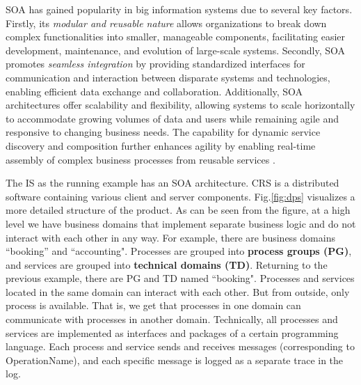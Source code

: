 \documentclass[12pt, times]{article}
\begin{document}
	\hspace*{5mm}SOA has gained popularity in big information systems due to several key factors. Firstly, its \textit{modular and reusable nature} allows organizations to break down complex functionalities into smaller, manageable components, facilitating easier development, maintenance, and evolution of large-scale systems. Secondly, SOA promotes \textit{seamless integration} by providing standardized interfaces for communication and interaction between disparate systems and technologies, enabling efficient data exchange and collaboration. Additionally, SOA architectures offer scalability and flexibility, allowing systems to scale horizontally to accommodate growing volumes of data and users while remaining agile and responsive to changing business needs. The capability for dynamic service discovery and composition further enhances agility by enabling real-time assembly of complex business processes from reusable services \cite{soa_2}. 
	
	\hspace*{5mm}The IS as the running example has an SOA architecture. CRS is a distributed software containing various client and server components. Fig.\ref{fig:dps} visualizes a more detailed structure of the product. As can be seen from the figure, at a high level we have business domains that implement separate business logic and do not interact with each other in any way. For example, there are business domains “booking” and “accounting". Processes are grouped into \textbf{process groups (PG)}, and services are grouped into \textbf{technical domains (TD)}. Returning to the previous example, there are PG and TD named “booking". Processes and services located in the same domain can interact with each other. But from outside, only process is available. That is, we get that processes in one domain can communicate with processes in another domain. Technically, all processes and services are implemented as interfaces and packages of a certain programming language. Each process and service sends and receives messages (corresponding to OperationName), and each specific message is logged as a separate trace in the log.
	
\end{document}
